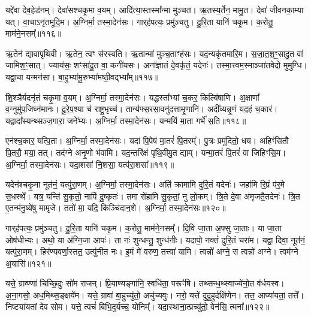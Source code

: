 यद्दे॑वा देव॒हेड॑नम्।
देवा॑सश्चकृ॒मा व॒यम्।
आदि॑त्या॒\-स्तस्मा᳚न्मा मुञ्चत।
ऋ॒तस्य॒र्तेन॒ मामु॒त।
देवा॑ जीवनका॒म्या यत्।
वा॒चा\-ऽनृ॑तमूदि॒म।
अ॒ग्निर्मा॒ तस्मा॒देन॑सः।
गार्‌\mbox{}ह॑पत्यः॒ प्रमु॑ञ्चतु।
दु॒रि॒ता यानि॑ चकृ॒म।
क॒रोतु॒ माम॑ने॒नसम्᳚॥११६॥

ऋ॒तेन॑ द्यावापृथिवी।
ऋ॒तेन॒ त्वꣳ स॑रस्वति।
ऋ॒तान्मा॑ मुञ्च॒ताꣳह॑सः।
यद॒न्यकृ॑तमारि॒म।
स॒जा॒त॒श॒ꣳ॒सादु॒त वा॑ जामिश॒ꣳ॒सात्।
ज्याय॑सः॒ शꣳसा॑दु॒त वा॒ कनी॑यसः।
अना᳚ज्ञातं दे॒वकृ॑तं॒ यदेनः॑।
तस्मा॒त्त्वम॒स्माञ्जा॑तवेदो मुमुग्धि।
यद्वा॒चा यन्मन॑सा।
बा॒हुभ्या॑मू॒रुभ्या॑मष्ठी॒वद्भ्या᳚म्॥११७॥

शि॒श्ञैर्यदनृ॑तं चकृ॒मा व॒यम्।
अ॒ग्निर्मा॒ तस्मा॒देन॑सः।
यद्धस्ता᳚भ्यां च॒कर॒ किल्बि॑षाणि।
अ॒क्षाणां᳚ व॒ग्नुमु॑प॒जिघ्न॑मानः।
दू॒रे॒प॒श्या च॑ राष्ट्र॒भृच्च॑।
तान्य॑फ्स॒रसा॒वनु॑दत्तामृ॒णानि॑।
अदी᳚व्यन्नृ॒णं यद॒हं च॒कार॑।
यद्वादा᳚स्यन्थ्सञ्ज॒गारा॒ जने᳚भ्यः।
अ॒ग्निर्मा॒ तस्मा॒देन॑सः।
यन्मयि॑ मा॒ता गर्भे॑ स॒ति॥११८॥

एन॑श्च॒कार॒ यत्पि॒ता।
अ॒ग्निर्मा॒ तस्मा॒देन॑सः।
यदा॑ पि॒पेष॑ मा॒तरं॑ पि॒तरम्᳚।
पु॒त्रः प्रमु॑दितो॒ धय\sn{}।
अहिꣳ॑सितौ पि॒तरौ॒ मया॒ तत्।
तद॑ग्ने अनृ॒णो भ॑वामि।
यद॒न्तरि॑क्षं पृथि॒वीमु॒त द्याम्।
यन्मा॒तरं॑ पि॒तरं॑ वा जिहिꣳसि॒म।
अ॒ग्निर्मा॒ तस्मा॒देन॑सः।
यदा॒शसा॑ नि॒शसा॒ यत्प॑रा॒शसा᳚॥११९॥

यदेन॑श्चकृ॒मा नूत॑नं॒ यत्पु॑रा॒णम्।
अ॒ग्निर्मा॒ तस्मा॒देन॑सः।
अति॑ क्रामामि दुरि॒तं यदेनः॑।
जहा॑मि रि॒प्रं प॑र॒मे स॒धस्थे᳚।
यत्र॒ यन्ति॑ सु॒कृतो॒ नापि॑ दु॒ष्कृतः॑।
तमा रो॑हामि सु॒कृतां॒ नु लो॒कम्।
त्रि॒ते दे॒वा अ॑मृजतै॒तदेनः॑।
त्रि॒त ए॒तन्म॑नु॒ष्ये॑षु मामृजे।
ततो॑ मा॒ यदि॒ किञ्चि॑दान॒शे।
अ॒ग्निर्मा॒ तस्मा॒देन॑सः॥१२०॥

गार्‌\mbox{}ह॑पत्यः॒ प्रमु॑ञ्चतु।
दु॒रि॒ता यानि॑ चकृ॒म।
क॒रोतु॒ माम॑ने॒नसम्᳚।
दि॒वि जा॒ता अ॒फ्सु जा॒ताः।
या जा॒ता ओष॑धीभ्यः।
अथो॒ या अ॑ग्नि॒जा आपः॑।
ता नः॑ शुन्धन्तु॒ शुन्ध॑नीः।
यदापो॒ नक्तं॑ दुरि॒तं चरा॑म।
यद्वा॒ दिवा॒ नूत॑नं॒ यत्पु॑रा॒णम्।
हिर॑ण्यवर्णा॒स्तत॒ उत्पु॑नीत नः।
इ॒मं मे॑ वरुण॒ तत्त्वा॑ यामि।
त्वन्नो॑ अग्ने॒ स त्वन्नो॑ अग्ने।
त्वम॑ग्ने अ॒यासि॑॥१२१॥\anuvakamend[अ॒ने॒नस॑मष्ठी॒वद्भ्याꣳ॑ स॒ति प॑रा॒शसा॑\-ऽऽन॒शे᳚\-ऽग्निर्मा॒ तस्मा॒देन॑सः पुनीत न॒स्त्रीणि॑ च (यद्दे॑वा॒ देवा॑ ऋ॒तेन॑ सजातश॒ꣳ॒साद्यद्वा॒चा यद्धस्ता᳚भ्या॒मदी᳚व्यं॒ यन्मयि॑ मा॒ता यदा॑ पि॒पेष॒ यद॒न्तरि॑क्षं॒ यदा॒शसाऽति॑ क्रामामि त्रि॒ते दे॒वा दि॒वि जा॒ता अ॒फ्सु जा॒ता यदाप॑ इ॒मं मे॑ वरुण॒ तत्त्वा॑ यामि॒ त्वन्नो॑ अग्ने॒ स त्वन्नो॑ अग्ने॒ त्वम॑ग्ने अ॒यासि॑।
)]

यत्ते॒ ग्राव्ण्णा॑ चिच्छि॒दुः सो॑म राजन्।
प्रि॒याण्यङ्गा॑नि॒ स्वधि॑ता॒ परूꣳ॑षि।
तथ्सन्ध॒थ्स्वाज्ये॑नो॒त व॑र्धयस्व।
अ॒ना॒गसो॒ अध॒मिथ्स॒ङ्क्षये॑म।
यत्ते॒ ग्रावा॑ बा॒हुच्यु॑तो॒ अचु॑च्यवुः।
नरो॒ यत्ते॑ दुदु॒हुर्दक्षि॑णेन।
तत्त॒ आप्या॑यतां॒ तत्ते᳚।
निष्ट्या॑यतां देव सोम।
यत्ते॒ त्वचं॑ बिभि॒दुर्यच्च॒ योनिम्᳚।
यदा॒स्थाना॒त्प्रच्यु॑तो॒ वेन॑सि॒ त्मना᳚॥१२२॥

